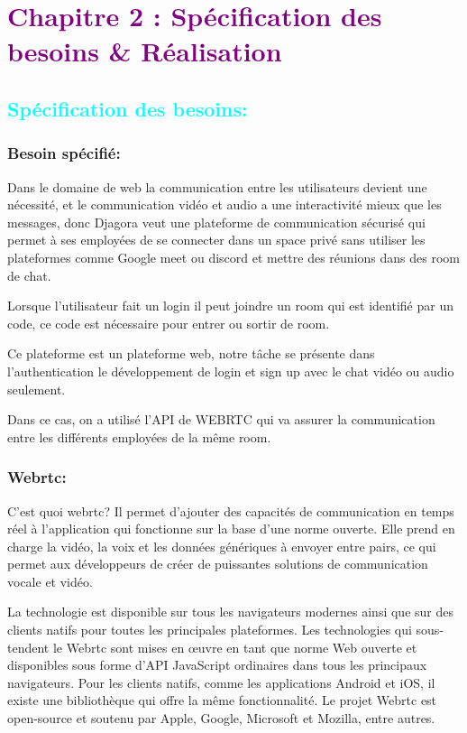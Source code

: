 \chapter{\textcolor{purple}{Chapitre 2 : Spécification des besoins & Réalisation}}
\section{\textcolor{cyan}{Spécification des besoins:}}
\subsection{Besoin spécifié:}
Dans le domaine de web la communication entre les utilisateurs devient une nécessité, et le communication vidéo et audio a une interactivité mieux que les messages, donc Djagora veut une plateforme de communication sécurisé qui permet à ses employées de se connecter dans un space privé sans utiliser les plateformes comme Google meet ou discord et mettre des réunions dans des room de chat.\par
Lorsque l’utilisateur fait un login il peut joindre un room qui est identifié par un code, ce code est nécessaire pour entrer ou sortir de room.\par
Ce plateforme est un plateforme web, notre tâche se présente dans l’authentication le développement de login et sign up avec le chat vidéo ou audio seulement.\par
Dans ce cas, on a utilisé l’API de WEBRTC qui va assurer la communication entre les différents employées de la même room.\par
\subsection{Webrtc:}
C’est quoi webrtc?\newline
Il permet d’ajouter des capacités de communication en temps réel à l’application qui fonctionne sur la base d'une norme ouverte. Elle prend en charge la vidéo, la voix et les données génériques à envoyer entre pairs, ce qui permet aux développeurs de créer de puissantes solutions de communication vocale et vidéo.\par
La technologie est disponible sur tous les navigateurs modernes ainsi que sur des clients natifs pour toutes les principales plateformes. Les technologies qui sous-tendent le Webrtc sont mises en œuvre en tant que norme Web ouverte et disponibles sous forme d'API JavaScript ordinaires dans tous les principaux navigateurs. Pour les clients natifs, comme les applications Android et iOS, il existe une bibliothèque qui offre la même fonctionnalité. Le projet Webrtc est open-source et soutenu par Apple, Google, Microsoft et Mozilla, entre autres.\par
